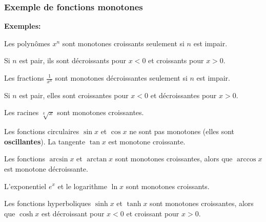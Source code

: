 
\begin{frame}
\frametitle{\bf Exemple de fonctions monotones}
\medskip 

{\small 
{\bf Exemples:}
\begin{itemize}
\bitem
Les polyn\^omes $x^n$ sont monotones croissants seulement si $n$ 
est impair. 
\vspace*{1mm}

Si $n$ est pair, ils sont d\'ecroissants pour $x<0$ et croissants pour $x>0$.  
\vspace*{1mm}

\parbox{10cm}{
\bitem
Les fractions $\frac{1}{x^n}$ sont monotones d\'ecroissantes seulement 
si $n$ est impair. 
\vspace*{1mm}

Si $n$ est pair, elles sont croissantes pour $x<0$ et d\'ecroissantes 
pour $x>0$.}
\vspace*{1mm}

\bitem
Les racines $\sqrt[k]{x}$ sont monotones croissantes. 
\vspace*{1mm}

\bitem
Les fonctions circulaires $\sin x$ et $\cos x$ ne sont pas monotones 
(elles sont {\bf oscillantes}).
La tangente $\tan x$ est monotone croissante. 
\vspace*{1mm}

\bitem
Les fonctions $\arcsin x$ et $\arctan x$ sont monotones croissantes, 
alors que $\arccos x$ est monotone d\'ecroissante. 
\vspace*{1mm}

\bitem
L'exponentiel $e^x$ et le logarithme $\ln x$ sont monotones croissants. 
\vspace*{1mm}

\bitem
Les fonctions hyperboliques $\sinh x$ et $\tanh x$ sont monotones 
croissantes, alors que $\cosh x$ est d\'ecroissant pour $x<0$ et 
croissant pour $x>0$. 
\end{itemize} 

}

\end{frame}


